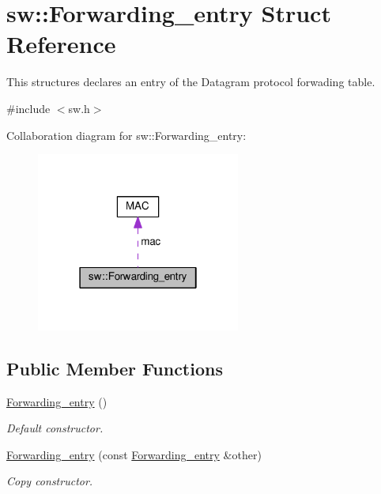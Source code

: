 \hypertarget{structsw_1_1Forwarding__entry}{}\section{sw\+:\+:Forwarding\+\_\+entry Struct Reference}
\label{structsw_1_1Forwarding__entry}


This structures declares an entry of the Datagram protocol forwading table.  




{\ttfamily \#include $<$sw.\+h$>$}



Collaboration diagram for sw\+:\+:Forwarding\+\_\+entry\+:\nopagebreak
\begin{figure}[H]
\begin{center}
\leavevmode
\includegraphics[width=190pt]{structsw_1_1Forwarding__entry__coll__graph}
\end{center}
\end{figure}
\subsection*{Public Member Functions}
\begin{DoxyCompactItemize}
\item 
\hyperlink{structsw_1_1Forwarding__entry_ad923fd6088887cc6f0b894045e04d8df}{Forwarding\+\_\+entry} ()
\begin{DoxyCompactList}\small\item\em Default constructor. \end{DoxyCompactList}\item 
\hyperlink{structsw_1_1Forwarding__entry_a504b52199970b085a23a28cd45b9b788}{Forwarding\+\_\+entry} (const \hyperlink{structsw_1_1Forwarding__entry}{Forwarding\+\_\+entry} \&other)
\begin{DoxyCompactList}\small\item\em Copy constructor. \end{DoxyCompactList}\end{DoxyCompactItemize}
